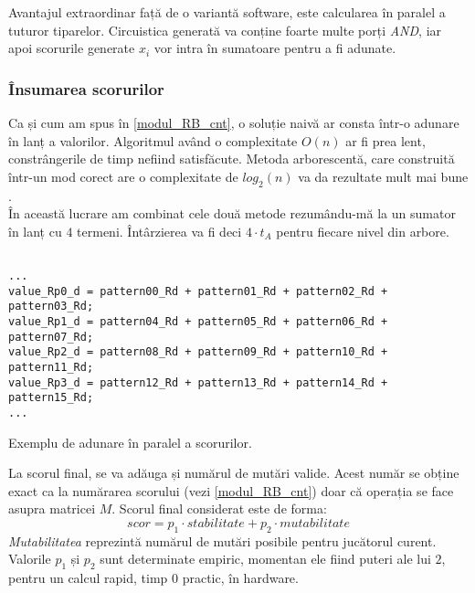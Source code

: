 \documentclass[12pt,twoside,a4paper,fleqn]{book}
\theoremstyle{definition}
\begin{document}
Avantajul extraordinar față de o variantă software, este calcularea în paralel a tuturor tiparelor. Circuistica generată va conține foarte multe porți \emph{AND}, iar apoi scorurile generate $x_{i}$ vor intra în sumatoare pentru a fi adunate.

\subsubsection{Însumarea scorurilor}
Ca și cum am spus în \ref{modul_RB_cnt}, o soluție naivă ar consta într-o adunare în lanț a valorilor. Algoritmul având o complexitate $O(n)$ ar fi prea lent, constrângerile de timp nefiind satisfăcute. Metoda arborescentă, care construită într-un mod corect are o complexitate de $log_{2}(n)$ va da rezultate mult mai bune \cite{cormen} \cite{hwang}.\\
În această lucrare am combinat cele două metode rezumându-mă la un sumator în lanț cu $4$ termeni. Întârzierea va fi deci $4 \cdot t_A$ pentru fiecare nivel din arbore.

\begin{fragmentsursa}
\begin{scriptsize}
\begin{verbatim}

...
value_Rp0_d = pattern00_Rd + pattern01_Rd + pattern02_Rd + pattern03_Rd; 
value_Rp1_d = pattern04_Rd + pattern05_Rd + pattern06_Rd + pattern07_Rd; 
value_Rp2_d = pattern08_Rd + pattern09_Rd + pattern10_Rd + pattern11_Rd; 
value_Rp3_d = pattern12_Rd + pattern13_Rd + pattern14_Rd + pattern15_Rd; 
...
\end{verbatim}
\end{scriptsize}
\caption{Exemplu de adunare în paralel a scorurilor.}
\label{frag_sablon2}
\end{fragmentsursa}

La scorul final, se va adăuga și numărul de mutări valide. Acest număr se obține exact ca la numărarea scorului (vezi \ref{modul_RB_cnt}) doar că operația se face asupra matricei $M$. Scorul final considerat este de forma:
\begin{equation}
scor = p_{1} \cdot stabilitate + p_{2} \cdot mutabilitate
\end{equation}
\emph{Mutabilitatea} reprezintă numărul de mutări posibile pentru jucătorul curent. Valorile $p_{1}$ și $p_{2}$ sunt determinate empiric, momentan ele fiind puteri ale lui $2$, pentru un calcul rapid, timp $0$ practic, în hardware.
\end{document}
